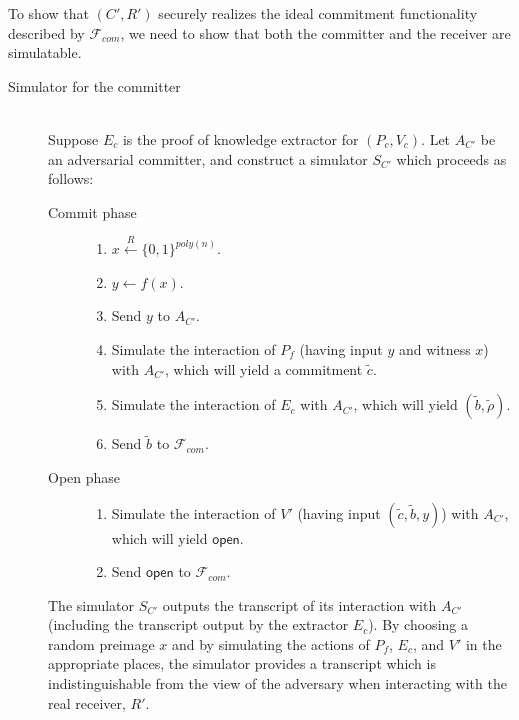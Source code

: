 \documentclass[draft]{article}
\newcommand{\getr}{\overset{R}{\gets}}
\newcommand{\getrsingle}{\getr\{0, 1\}}
\newcommand{\getrpoly}{\getrsingle^{poly(n)}}
\begin{document}
\begin{enumerate}
\begin{enumerate}
    To show that $(C', R')$ securely realizes the ideal commitment functionality described by $\mathcal{F}_{com}$, we need to show that both the committer and the receiver are simulatable.
    \begin{description}
    \item[Simulator for the committer] \hfill \\
      Suppose $E_c$ is the proof of knowledge extractor for $(P_c, V_c)$.
      Let $A_{C'}$ be an adversarial committer, and construct a simulator $S_{C'}$ which proceeds as follows:
      \begin{description}
      \item[Commit phase] \hfill
        \begin{enumerate}
        \item $x\getrpoly$.
        \item $y\gets f(x)$.
        \item Send $y$ to $A_{C'}$.
        \item Simulate the interaction of $P_f$ (having input $y$ and witness $x$) with $A_{C'}$, which will yield a commitment $\tilde{c}$.
        \item Simulate the interaction of $E_c$ with $A_{C'}$, which will yield $(\tilde{b}, \tilde{\rho})$.
        \item Send $\tilde{b}$ to $\mathcal{F}_{com}$.
        \end{enumerate}
      \item[Open phase] \hfill
        \begin{enumerate}
        \item Simulate the interaction of $V'$ (having input $(\tilde{c}, \tilde{b}, y)$) with $A_{C'}$, which will yield $\textsf{open}$.
        \item Send $\textsf{open}$ to $\mathcal{F}_{com}$.
        \end{enumerate}
      \end{description}
      The simulator $S_{C'}$ outputs the transcript of its interaction with $A_{C'}$ (including the transcript output by the extractor $E_c$).
      By choosing a random preimage $x$ and by simulating the actions of $P_f$, $E_c$, and $V'$ in the appropriate places, the simulator provides a transcript which is indistinguishable from the view of the adversary when interacting with the real receiver, $R'$.


\end{description}
\end{enumerate}
\end{enumerate}
\end{document}
